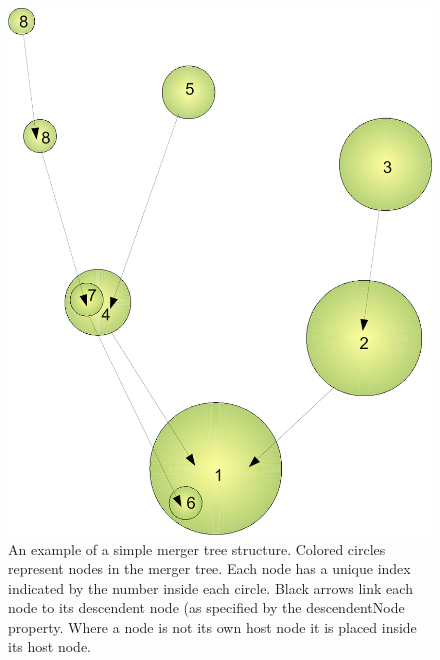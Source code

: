\begin{figure}
 \begin{center}
 \includegraphics[width=160mm]{Diagrams/MergerTreeSimple.pdf}
 \end{center}
 \caption{An example of a simple merger tree structure. Colored circles represent nodes in the merger tree. Each node has a unique index indicated by the number inside each circle. Black arrows link each node to its descendent node (as specified by the {\normalfont \ttfamily descendentNode} property. Where a node is not its own host node it is placed inside its host node.}
 \label{fig:MergerTreeSimple}
\end{figure}

